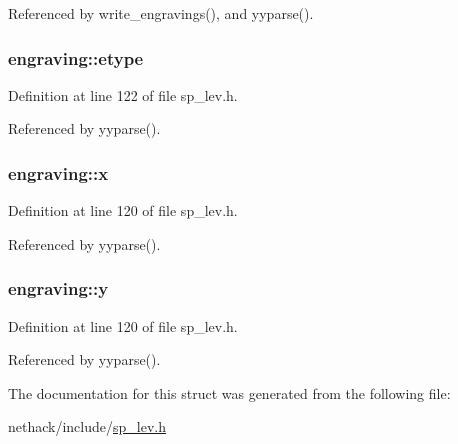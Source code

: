 Referenced by write\+\_\+engravings(), and yyparse().

\hypertarget{structengraving_a03aa435dd8c489b0803f9f4a10ef92b2}{
\subsubsection[{etype}]{ engraving\+::etype}}\label{structengraving_a03aa435dd8c489b0803f9f4a10ef92b2}


Definition at line 122 of file sp\+\_\+lev.\+h.



Referenced by yyparse().

\hypertarget{structengraving_a8f28b49b2f2b90a9227855bdbb4de2ab}{
\subsubsection[{x}]{ engraving\+::x}}\label{structengraving_a8f28b49b2f2b90a9227855bdbb4de2ab}


Definition at line 120 of file sp\+\_\+lev.\+h.



Referenced by yyparse().

\hypertarget{structengraving_a1b6846c11b9bcac6198bcb904a4f531f}{
\subsubsection[{y}]{ engraving\+::y}}\label{structengraving_a1b6846c11b9bcac6198bcb904a4f531f}


Definition at line 120 of file sp\+\_\+lev.\+h.



Referenced by yyparse().



The documentation for this struct was generated from the following file\+:\begin{DoxyCompactItemize}
\item 
nethack/include/\hyperlink{sp__lev_8h}{sp\+\_\+lev.\+h}\end{DoxyCompactItemize}
